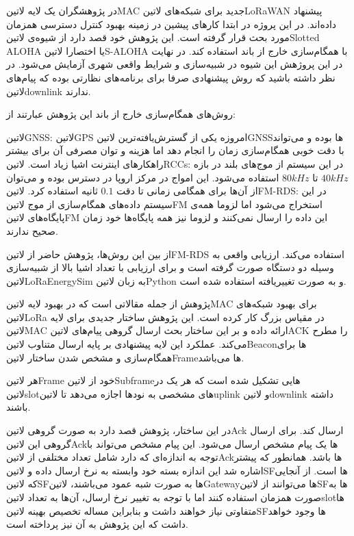 
در  پژوهشگران یک لایه ‌لاتین{MAC} جدید برای شبکه‌های ‌لاتین{LoRaWAN} پیشنهاد داده‌اند. در این پروژه در ابتدا کارهای پیشین در زمینه بهبود کنترل دسترسی همزمان
مورد بحث قرار گرفته است. این پژوهش خود قصد دارد از شیوه‌ی ‌لاتین{Slotted ALOHA} یا اختصارا ‌لاتین{S-ALOHA} با همگام‌سازی خارج از باند استفاده کند.
در نهایت در این پروژهش این شیوه در شبیه‌سازی و شرایط واقعی شهری آزمایش می‌شود. در نظر داشته باشید که روش پیشنهادی صرفا برای برنامه‌های نظارتی بوده که پیام‌های ‌لاتین{downlink} ندارند.

روش‌های همگام‌سازی خارج از باند این پژوهش عبارتند از:

 ‌لاتین{GNSS}: ‌لاتین{GPS} امروزه یکی از گسترش‌یافته‌ترین ‌لاتین{GNSS}ها بوده و می‌تواند با دقت خوبی همگام‌سازی زمان را انجام دهد اما هزینه و توان مصرفی آن برای بیشتر راهکارهای اینترنت اشیا زیاد است.
 ‌لاتین{RCCs}:‌ در این سیستم از موج‌های بلند در بازه $40kHz$ تا $80kHz$ استفاده می‌شود. این امواج در مرکز اروپا در دسترس بوده و می‌توان از آن‌ها برای همگامی زمانی تا دقت $0.1$ ثانیه استفاده کرد.
 ‌لاتین{FM-RDS}: در این سیستم داده‌های همگام‌سازی از موج ‌لاتین{FM} استخراج می‌شود اما لزوما همه‌ی پایگاه‌های ‌لاتین{FM} این داده را ارسال نمی‌کنند و لزوما نیز همه پایگاه‌ها خود زمان صحیح ندارند.

از بین این روش‌ها، پژوهش حاضر از ‌لاتین{FM-RDS} استفاده می‌کند. ارزیابی واقعی به وسیله دو دستگاه صورت گرفته است و برای ارزیابی با تعداد اشیا بالا از شبیه‌سازی ‌لاتین{LoRaEnergySim} به زبان ‌لاتین{Python} و به صورت تغییریافته استفاده شده است.


پژوهش  از جمله مقالاتی است که در بهبود لایه ‌لاتین{MAC} برای بهبود شبکه‌های ‌لاتین{LoRa} در مقیاس بزرگ کار کرده است.
این پژوهش ساختار جدیدی برای لایه ‌لاتین{MAC} ارائه داده و بر این ساختار بحث ارسال گروهی پیام‌های ‌لاتین{ACK} را مطرح می‌کند.
عملکرد این لایه پیشنهادی بر پایه ارسال متناوب ‌لاتین{Beacon}ها برای همگام‌سازی و مشخص شدن ساختار ‌لاتین{Frame}ها می‌باشد.

هر ‌لاتین{Frame} خود از ‌لاتین{Subframe}هایی تشکیل شده است که هر یک در ‌لاتین{slot}های مشخصی به نودها
اجازه می‌دهد تا ‌لاتین{uplink} و ‌لاتین{downlink} داشته باشند.

در این ساختار، پژوهش قصد دارد به صورت گروهی ‌لاتین{Ack} ارسال کند. برای ارسال گروهی این ‌لاتین{Ack}ها یک پیام مشخص ارسال می‌شود.
این پیام مشخص می‌تواند با توجه به اندازه‌ای که دارد شامل تعداد مختلفی از ‌لاتین{Ack}ها باشد. همانطور که پیشتر اشاره شد این اندازه بسته خود وابسته به
نرخ ارسال داده و ‌لاتین{SF}ها است. از آنجایی که ‌لاتین{SF}ها به صورت شبه عمود می‌باشند، ‌لاتین{Gateway}ها می‌توانند از ‌لاتین{SF}ها به صورت همزمان
استفاده کنند اما با توجه به تغییر نرخ ارسال، آن‌ها به تعداد ‌لاتین{slot}ها متفاوتی نیاز خواهند داشت و بنابراین مساله تخصیص بهینه ‌لاتین{SF}ها وجود خواهد داشت که این پژوهش به
آن نیز پرداخته است.

